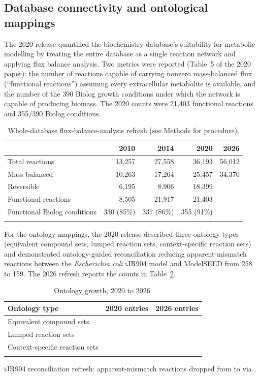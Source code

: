 \subsection{Database connectivity and ontological mappings}

The 2020 release quantified the biochemistry database's suitability for metabolic
modelling by treating the entire database as a single reaction network and
applying flux balance analysis. Two metrics were reported (Table~5 of the 2020
paper): the number of reactions capable of carrying nonzero mass-balanced flux
(``functional reactions'') assuming every extracellular metabolite is available,
and the number of the 390 Biolog growth conditions under which the network is
capable of producing biomass. The 2020 counts were 21,403 functional reactions
and 355/390 Biolog conditions.

\begin{table}[!t]
\caption{Whole-database flux-balance-analysis refresh (see Methods for
procedure).\label{tab:wholedbfba}}%
\begin{tabular*}{\textwidth}{@{\extracolsep\fill}lrrrr@{\extracolsep\fill}}
\toprule
 & 2010 & 2014 & 2020 & 2026 \\
\midrule
Total reactions              & 13,257     & 27,558     & 36,193     & 56,012 \\
Mass balanced                & 10,263     & 17,264     & 25,457     & 34,370 \\
Reversible                   & 6,195      & 8,906      & 18,399     & \TBD{} \\
Functional reactions         & 8,505      & 21,917     & 21,403     & \TBD{} \\
Functional Biolog conditions & 330 (85\%) & 337 (86\%) & 355 (91\%) & \TBD{} \\
\botrule
\end{tabular*}
\end{table}

For the ontology mappings, the 2020 release described three ontology types
(equivalent compound sets, lumped reaction sets, context-specific reaction sets)
and demonstrated ontology-guided reconciliation reducing apparent-mismatch
reactions between the \textit{Escherichia coli} iJR904 model and ModelSEED from
258 to 159. The 2026 refresh reports the counts in Table~\ref{tab:ontology}.

\begin{table}[!t]
\caption{Ontology growth, 2020 to 2026.\label{tab:ontology}}%
\begin{tabular*}{\columnwidth}{@{\extracolsep\fill}lrr@{\extracolsep\fill}}
\toprule
Ontology type & 2020 entries & 2026 entries \\
\midrule
Equivalent compound sets        & \TBD{} & \TBD{} \\
Lumped reaction sets            & \TBD{} & \TBD{} \\
Context-specific reaction sets  & \TBD{} & \TBD{} \\
\botrule
\end{tabular*}
\end{table}

iJR904 reconciliation refresh: apparent-mismatch reactions dropped from
\TBD[2026 baseline] to  via .
